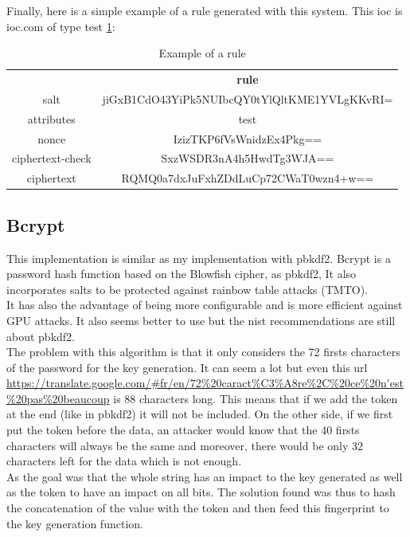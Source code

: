 \documentclass{eplmastersthesis}
\begin{document}
Finally, here is a simple example of a rule generated with this system. This \gls{ioc} is ioc.com of type test \ref{Example-rule-pbkdf2}:
\begin{table}[]
\centering
\caption{Example of a rule}
\label{Example-rule-pbkdf2}
\begin{tabular}{cc}
{\textbf{}}  & {\textbf{rule}}                          \\
salt             & jiGxB1CdO43YiPk5NUIbcQY0tYlQltKME1YVLgKKvRI= \\
attributes       & test                                         \\
nonce            & IzizTKP6fVsWnidzEx4Pkg==                     \\
ciphertext-check & SxzWSDR3nA4h5HwdTg3WJA==                     \\
ciphertext       & RQMQ0a7dxJuFxhZDdLuCp72CWaT0wzn4+w==        
\end{tabular}
\end{table}

\subsection{Bcrypt}
\label{sec:BcryptExp}
This implementation is similar as my implementation with \gls{pbkdf2}. Bcrypt is a password hash function based on the Blowfish cipher, as \gls{pbkdf2}, It also incorporates salts to be protected against rainbow table attacks (TMTO).\\
It has also the advantage of being more configurable and is more efficient against GPU attacks. It also seems better to use but the \gls{nist} recommendations are still about \gls{pbkdf2}.\\

The problem with this algorithm is that it only considers the 72 firsts characters of the password for the key generation. It can seem a lot but even this \gls{url} \url{https://translate.google.com/#fr/en/72\%20caract\%C3\%A8re\%2C\%20ce\%20n'est\%20pas\%20beaucoup} is 88 characters long. This means that if we add the token at the end (like in \gls{pbkdf2}) it will not be included. On the other side, if we first put the token before the data, an attacker would know that the 40 firsts characters will always be the same and moreover, there would be only 32 characters left for the data which is not enough.\\
As the goal was that the whole string has an impact to the key generated as well as the token to have an impact on all bits. The solution found was thus  to hash the concatenation of the value with the token and then feed this fingerprint to the key generation function.\\
\end{document}
